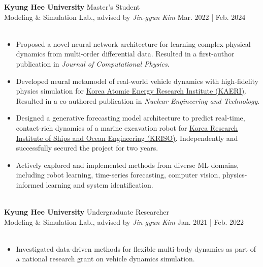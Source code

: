 \documentclass[a4paper,10pt]{extarticle}
\begin{document}
\noindent\textbf{Kyung Hee University} \hfill Master's Student\\
Modeling \& Simulation Lab., advised by \textsl{Jin-gyun Kim} \hfill Mar. 2022 | Feb. 2024\\
\vspace*{-0.25cm}\\
\begin{minipage}{0.77\textwidth}
	\footnotesize
	\begin{itemize}
		\item Proposed a novel neural network architecture for learning complex physical dynamics from multi-order differential data. Resulted in a first-author publication in \textit{Journal of Computational Physics}.
		\item Developed neural metamodel of real-world vehicle dynamics with high-fidelity physics simulation for \href{https://www.kaeri.re.kr/eng/}{\ul{Korea Atomic Energy Research Institute (KAERI)}}. Resulted in a co-authored publication in \textit{Nuclear Engineering and Technology}.
		\item Designed a generative forecasting model architecture to predict real-time, contact-rich dynamics of a marine excavation robot for \href{https://www.kriso.re.kr/eng/}{\ul{Korea Research Institute of Ships and Ocean Engineering (KRISO)}}. Independently and successfully secured the project for two years.
		\item Actively explored and implemented methods from diverse ML domains, including robot learning, time-series forecasting, computer vision, physics-informed learning and system identification.
	\end{itemize}
\end{minipage}\\

\vspace*{0.1cm}
\noindent\textbf{Kyung Hee University} \hfill Undergraduate Researcher\\
Modeling \& Simulation Lab., advised by \textsl{Jin-gyun Kim} \hfill Jan. 2021 | Feb. 2022\\
\vspace*{-0.25cm}\\
\begin{minipage}{0.77\textwidth}
	\footnotesize
	\begin{itemize}
		\item Investigated data-driven methods for flexible multi-body dynamics as part of a national research grant on vehicle dynamics simulation.
	\end{itemize}
\end{minipage}\\
\vspace*{-0.2cm}
\end{document}
